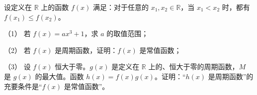 \begin{question}
设定义在 $\mathbb R$ 上的函数 $f(x)$ 满足：对于任意的 $x_1,x_2\in\mathbb R$，当 $x_1<x_2$ 时，都有 $f(x_1)\leqslant f(x_2)$。

（1） 若 $f(x)=ax^3+1$，求 $a$ 的取值范围；

（2） 若 $f(x)$ 是周期函数，证明：$f(x)$ 是常值函数；

（3） 设 $f(x)$ 恒大于零。$g(x)$ 是定义在 $\mathbb R$ 上的、恒大于零的周期函数，$M$ 是 $g(x)$ 的最大值。函数 $h(x)=f(x)g(x)$。证明：“$h(x)$ 是周期函数”的充要条件是“$f(x)$ 是常值函数”。

\end{question}